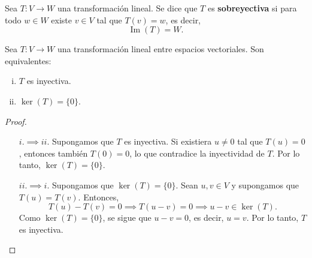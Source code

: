 \begin{definition}
Sea $T: V \to W$ una transformación lineal. Se dice que $T$ es \textbf{sobreyectiva} si para todo $w \in W$ existe $v \in V$ tal que $T(v) = w$, es decir,
\[
\operatorname{Im}(T) = W.
\]
\end{definition}


\begin{theorem}
Sea $T: V \to W$ una transformación lineal entre espacios vectoriales. Son equivalentes:
\begin{enumerate}[i.]
    \item $T$ es inyectiva.
    \item $\ker(T) = \{0\}$.
\end{enumerate}
\begin{proof}
\begin{itemize}
    \item[$i. \implies ii.$] Supongamos que $T$ es inyectiva. Si existiera $u \neq 0$ tal que $T(u) = 0$, entonces también $T(0) = 0$, lo que contradice la inyectividad de $T$. Por lo tanto, $\ker(T) = \{0\}$.
    \item[$ii. \implies i.$] Supongamos que $\ker(T) = \{0\}$. Sean $u, v \in V$ y supongamos que $T(u) = T(v)$. Entonces,
    \[
    T(u) - T(v) = 0 \implies T(u - v) = 0 \implies u - v \in \ker(T).
    \]
    Como $\ker(T) = \{0\}$, se sigue que $u - v = 0$, es decir, $u = v$. Por lo tanto, $T$ es inyectiva.
\end{itemize}
\end{proof}
\end{theorem}

